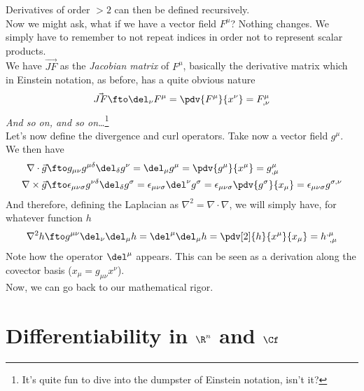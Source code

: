 \documentclass[../mmf.tex]{subfiles}
\begin{document}
Derivatives of order $>2$ can then be defined recursively.\\
Now we might ask, what if we have a vector field $F^\mu$? Nothing changes. We simply have to remember to not repeat indices in order not to represent scalar products.\\
We have $\vec{JF}$ as the \textit{Jacobian matrix} of $F^\mu$, basically the derivative matrix which in Einstein notation, as before, has a quite obvious nature
\begin{equation}
	\vec{JF}\fto\del_\nu F^\mu=\pdv{F^\mu}{x^\nu}=F^\mu_{,\nu}
	\label{eq:jacobianenot}
\end{equation}
\textit{And so on, and so on\ldots}\footnote{It's quite fun to dive into the dumpster of Einstein notation, isn't it?}\\
Let's now define the divergence and curl operators. Take now a vector field $g^\mu$. We then have
\begin{equation}
	\begin{aligned}
		\nabla\cdot\vec{g}&\fto g_{\mu\nu}g^{\mu\delta}\del_\delta g^\nu=\del_\mu g^\mu=\pdv{g^\mu}{x^\mu}=g^{\mu}_{,\mu}\\
		\nabla\times\vec{g}&\fto \epsilon_{\mu\nu\sigma}g^{\nu\delta}\del_\delta g^\sigma=\epsilon_{\mu\nu\sigma}\del^\nu g^\sigma=\epsilon_{\mu\nu\sigma}\pdv{g^\sigma}{x_\mu}=\epsilon_{\mu\nu\sigma}g^{\sigma,\nu}
	\end{aligned}
	\label{eq:divroten}
\end{equation}
And therefore, defining the Laplacian as $\nabla^2=\nabla\cdot\nabla$, we will simply have, for whatever function $h$
\begin{equation}
	\nabla^2 h\fto g^{\mu\nu}\del_\nu\del_\mu h=\del^\mu\del_\mu h=\pdv[2]{h}{x^\mu}{x_\mu}=h^{,\mu}_{\ ,\mu}
	\label{eq:laplacianen}
\end{equation}
Note how the operator $\del^\mu$ appears. This can be seen as a derivation along the covector basis ($x_\mu=g_{\mu\nu}x^\nu$).\\
Now, we can go back to our mathematical rigor.\newpage
\section{Differentiability in $\R^n$ and $\Cf$}
\end{document}
